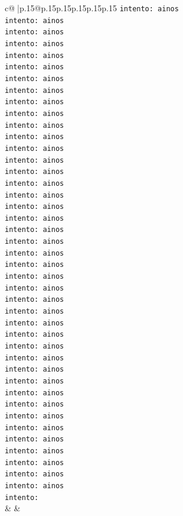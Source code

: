 \documentclass{article}
\begin{document}
{\begin{supertabular}{c@{$\;$}|p{.15\linewidth}@{}p{.15\linewidth}p{.15\linewidth}p{.15\linewidth}p{.15\linewidth}p{.15\linewidth}}
{{{\texttt{intento: ainos} \\
\texttt{intento: ainos} \\
\texttt{intento: ainos} \\
\texttt{intento: ainos} \\
\texttt{intento: ainos} \\
\texttt{intento: ainos} \\
\texttt{intento: ainos} \\
\texttt{intento: ainos} \\
\texttt{intento: ainos} \\
\texttt{intento: ainos} \\
\texttt{intento: ainos} \\
\texttt{intento: ainos} \\
\texttt{intento: ainos} \\
\texttt{intento: ainos} \\
\texttt{intento: ainos} \\
\texttt{intento: ainos} \\
\texttt{intento: ainos} \\
\texttt{intento: ainos} \\
\texttt{intento: ainos} \\
\texttt{intento: ainos} \\
\texttt{intento: ainos} \\
\texttt{intento: ainos} \\
\texttt{intento: ainos} \\
\texttt{intento: ainos} \\
\texttt{intento: ainos} \\
\texttt{intento: ainos} \\
\texttt{intento: ainos} \\
\texttt{intento: ainos} \\
\texttt{intento: ainos} \\
\texttt{intento: ainos} \\
\texttt{intento: ainos} \\
\texttt{intento: ainos} \\
\texttt{intento: ainos} \\
\texttt{intento: ainos} \\
\texttt{intento: ainos} \\
\texttt{intento: ainos} \\
\texttt{intento: ainos} \\
\texttt{intento: ainos} \\
\texttt{intento: ainos} \\
\texttt{intento: ainos} \\
\texttt{intento: ainos} \\
\texttt{intento: ainos} \\
\texttt{intento:} \\
            }
        }
    }
    & & \\ \\


\end{supertabular}}
\end{document}
